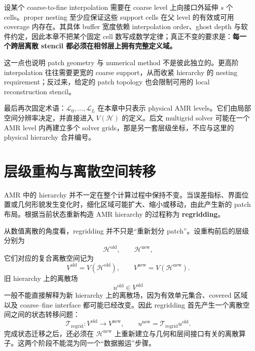 设某个 coarse-to-fine interpolation 需要在 coarse level 上向接口外延伸 $s$ 个 cells。proper nesting 至少应保证这些 support cells 在父 level 的有效或可用 coverage 内存在。其具体 buffer 宽度依赖 interpolation order、ghost depth 与软件约定，因此本章不把某个固定 cell 数写成数学定律；真正不变的要求是：\textbf{每一个跨层离散 stencil 都必须在相邻层上拥有完整定义域。}

这一点也说明 patch geometry 与 numerical method 不是彼此独立的。更高阶 interpolation 往往需要更宽的 coarse support，从而收紧 hierarchy 的 nesting requirement；反过来，给定的 patch topology 也会限制可用的 local reconstruction stencil。

最后再次固定术语：$\mathcal L_0,\ldots,\mathcal L_L$ 在本章中只表示 physical AMR levels。它们由局部空间分辨率决定，并直接进入 $V(\mathcal H)$ 的定义。后文 multigrid solver 可能在一个 AMR level 内再建立多个 solver grids，那是另一套层级坐标，不应与这里的 physical hierarchy 合并编号。

\section{层级重构与离散空间转移}
\label{sec:amr-regridding}

AMR 中的 hierarchy 并不一定在整个计算过程中保持不变。当误差指标、界面位置或几何形貌发生变化时，细化区域可能扩大、缩小或移动，由此产生新的 patch 布局。根据当前状态重新构造 AMR hierarchy 的过程称为 \textbf{regridding}。

从数值离散的角度看，regridding 并不只是“重新划分 patch”。设重构前后的层级分别为
\begin{equation}
\mathcal H^{\mathrm{old}},
\qquad
\mathcal H^{\mathrm{new}},
\end{equation}
它们对应的复合离散空间记为
\begin{equation}
V^{\mathrm{old}}=V(\mathcal H^{\mathrm{old}}),
\qquad
V^{\mathrm{new}}=V(\mathcal H^{\mathrm{new}}).
\end{equation}
旧 hierarchy 上的离散场
\begin{equation}
u^{\mathrm{old}}\in V^{\mathrm{old}}
\end{equation}
一般不能直接解释为新 hierarchy 上的离散场，因为有效单元集合、covered 区域以及 coarse--fine interface 都可能已经改变。因此 regridding 首先产生一个离散空间之间的状态转移问题：
\begin{equation}
\boxed{
\mathcal T_{\mathrm{regrid}}:
V^{\mathrm{old}}\longrightarrow V^{\mathrm{new}},
\qquad
u^{\mathrm{new}}
=\mathcal T_{\mathrm{regrid}}u^{\mathrm{old}}.
}
\label{eq:amr-regrid-transfer-operator}
\end{equation}
完成状态迁移之后，还必须在 $\mathcal H^{\mathrm{new}}$ 上重新建立与几何和层间接口有关的离散算子。这两个阶段不能混为同一个“数据搬运”步骤。

